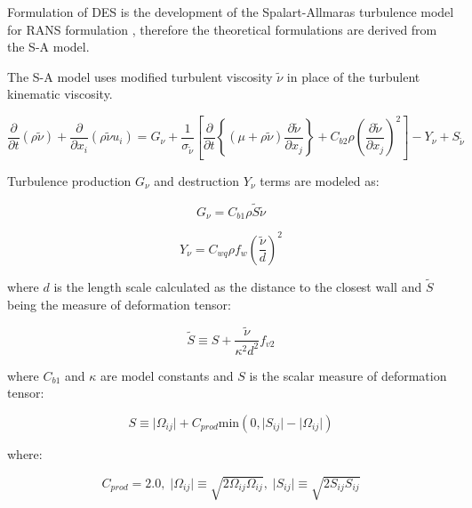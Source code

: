Formulation of DES is the development of the Spalart-Allmaras turbulence model for RANS formulation \citep{desspalart}, therefore the theoretical formulations are derived from the S-A model.

The S-A model uses modified turbulent viscosity $\tilde{\nu}$ in place of the turbulent kinematic viscosity.

\begin{equation} \label{eq:nutilde}
\frac{\partial}{\partial t} \left( \rho \tilde{\nu} \right)
+ \frac{\partial}{\partial x_i} \left( \rho \tilde{\nu} u_i \right)
= G_{\nu} + \frac{1}{\sigma_{\tilde{\nu}}}
\left[
\frac{\partial}{\partial t} \left\lbrace \left( \mu + \rho \tilde{\nu} \right) \frac{\partial \tilde{\nu}}{\partial x_j} \right\rbrace
+ C_{b2} \rho \left( \frac{\partial \tilde{\nu}}{\partial x_{j}}\right)^{2}
\right]
- Y_{\nu} + S_{\tilde{\nu}}
\end{equation}

Turbulence production $G_{\nu}$ and destruction $Y_{\nu}$ terms are modeled as:

\begin{equation} \label{eq:SAGnu}
G_{\nu} = C_{b1} \rho \tilde{S} \tilde{\nu}
\end{equation}

\begin{equation} \label{eq:SAYnu}
Y_{\nu} = C_{wq} \rho f_{w} \left(\frac{\tilde{\nu}}{d} \right)^2
\end{equation}

\noindent where $d$ is the length scale calculated as the distance to the closest wall and $\tilde{S}$ being the measure of deformation tensor:

\begin{equation} \label{eq:SAdeform}
\tilde{S} \equiv S + \frac{\tilde{\nu}}{\kappa^2 d^2} f_{v2}
\end{equation}

\noindent where $C_{b1}$ and $\kappa$ are model constants and $S$ is the scalar measure of deformation tensor:

\begin{equation} \label{eq:SAdeform2}
S \equiv \lvert \Omega_{ij} \rvert + C_{prod} \text{min} \left(0, \lvert S_{ij} \rvert - \lvert \Omega_{ij} \rvert \right)
\end{equation}

\noindent where:

\begin{equation} \label{eq:SAdeform3}
C_{prod} = 2.0, \;
\lvert \Omega_{ij} \rvert \equiv \sqrt{2 \Omega_{ij} \Omega_{ij}}, \;
\lvert S_{ij} \rvert \equiv \sqrt{2 S_{ij} S_{ij}}
\end{equation}

